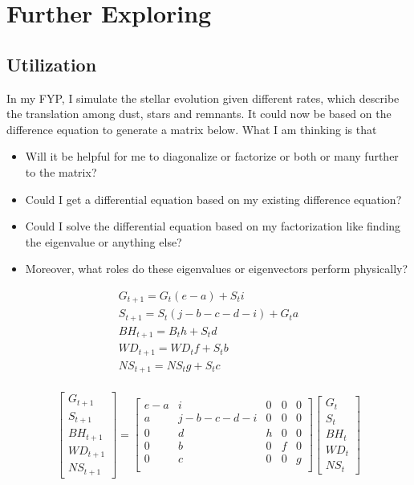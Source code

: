\chapter{Further Exploring}
\label{chapter5}
\section{Utilization}
In my FYP, I simulate the stellar evolution given different rates, which describe the translation among dust, stars and remnants. It could now be based on the difference equation to generate a matrix below. What I am thinking is that
\begin{itemize}
    \item Will it be helpful for me to diagonalize or factorize or both or many further to the matrix?
    \item Could I get a differential equation based on my existing difference equation?
    \item Could I solve the differential equation based on my factorization like finding the eigenvalue or anything else?
    \item Moreover, what roles do these eigenvalues or eigenvectors perform physically? 
\end{itemize}

\begin{equation}
\begin{split}
    G_{t+1} = G_t (e-a) + S_t i \\ 
    S_{t+1} = S_t(j-b-c-d-i) + G_t a \\
    BH_{t+1} = B_th + S_td \\
    WD _{t+1} = WD_tf + S_tb\\
    NS_{t+1} = NS_tg + S_tc\\
\end{split}
\end{equation}


\begin{equation}
\begin{bmatrix}
G_{t+1} \\ S_{t+1} \\ BH_{t+1} \\ WD_{t+1} \\ NS_{t+1} 
\end{bmatrix}
=
\begin{bmatrix}
    e-a & i & 0 & 0 & 0 \\
    a & j-b-c-d-i & 0 & 0 & 0 \\
    0 & d & h & 0 & 0 \\
    0 & b & 0 & f & 0 \\
    0 & c & 0 & 0 & g \\
\end{bmatrix}
\begin{bmatrix}
    G_{t} \\ S_{t} \\ BH_{t} \\ WD_{t} \\ NS_{t}
\end{bmatrix}
\label{Matrix Evolution}
\end{equation}

